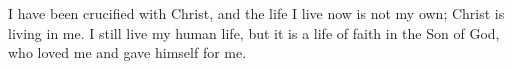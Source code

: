 
\lettrine{I}{} have been crucified with Christ, and the life I live now is not my own; Christ is living in me. I still live my human life, but it is a life of faith in the Son of God, who loved me and gave himself for me.
